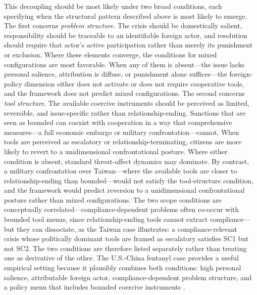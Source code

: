 \documentclass[12pt,letterpaper]{article}
\begin{document}
This decoupling should be most likely under two broad conditions, each specifying when the structural pattern described above is most likely to emerge. The first concerns \emph{problem structure}. The crisis should be domestically salient, responsibility should be traceable to an identifiable foreign actor, and resolution should require that actor's active participation rather than merely its punishment or exclusion. Where these elements converge, the conditions for mixed configurations are most favorable. When any of them is absent---the issue lacks personal salience, attribution is diffuse, or punishment alone suffices---the foreign-policy dimension either does not activate or does not require cooperative tools, and the framework does not predict mixed configurations. The second concerns \emph{tool structure}. The available coercive instruments should be perceived as limited, reversible, and issue-specific rather than relationship-ending. Sanctions that are seen as bounded can coexist with cooperation in a way that comprehensive measures---a full economic embargo or military confrontation---cannot. When tools are perceived as escalatory or relationship-terminating, citizens are more likely to revert to a unidimensional confrontational posture. Where either condition is absent, standard threat-affect dynamics may dominate. By contrast, a military confrontation over Taiwan---where the available tools are closer to relationship-ending than bounded---would not satisfy the tool-structure condition, and the framework would predict reversion to a unidimensional confrontational posture rather than mixed configurations. The two scope conditions are conceptually correlated---compliance-dependent problems often co-occur with bounded tool menus, since relationship-ending tools cannot extract compliance---but they can dissociate, as the Taiwan case illustrates: a compliance-relevant crisis whose politically dominant tools are framed as escalatory satisfies SC1 but not SC2. The two conditions are therefore listed separately rather than treating one as derivative of the other. The U.S.-China fentanyl case provides a useful empirical setting because it plausibly combines both conditions: high personal salience, attributable foreign actor, compliance-dependent problem structure, and a policy menu that includes bounded coercive instruments \citep{martinez-fernandez_holding_2024,hu_blame_2025, vangelov_did_2026}.
\end{document}
